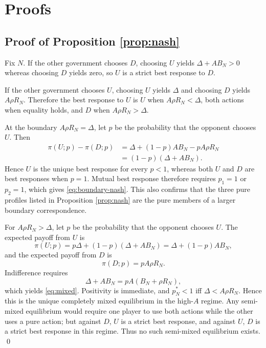 \section{Proofs}
\label{app:proofs}

\subsection{Proof of Proposition \ref{prop:nash}}

Fix $N$. If the other government chooses $D$, choosing $U$ yields $\Delta+A B_N>0$ whereas choosing $D$ yields zero, so $U$ is a strict best response to $D$.

If the other government chooses $U$, choosing $U$ yields $\Delta$ and choosing $D$ yields $A\rho R_N$. Therefore the best response to $U$ is $U$ when $A\rho R_N<\Delta$, both actions when equality holds, and $D$ when $A\rho R_N>\Delta$.

At the boundary $A\rho R_N=\Delta$, let $p$ be the probability that the opponent chooses $U$. Then
\begin{align}
\pi(U;p)-\pi(D;p)
&=\Delta+(1-p)A B_N-pA\rho R_N\\
&=(1-p)(\Delta+A B_N).
\end{align}
Hence $U$ is the unique best response for every $p<1$, whereas both $U$ and $D$ are best responses when $p=1$. Mutual best response therefore requires $p_1=1$ or $p_2=1$, which gives \eqref{eq:boundary-nash}. This also confirms that the three pure profiles listed in Proposition \ref{prop:nash} are the pure members of a larger boundary correspondence.

For $A\rho R_N>\Delta$, let $p$ be the probability that the opponent chooses $U$. The expected payoff from $U$ is
\begin{equation}
\pi(U;p)=p\Delta+(1-p)(\Delta+A B_N)
=\Delta+(1-p)A B_N,
\end{equation}
and the expected payoff from $D$ is
\begin{equation}
\pi(D;p)=pA\rho R_N.
\end{equation}
Indifference requires
\begin{equation}
\Delta+A B_N=pA(B_N+\rho R_N),
\end{equation}
which yields \eqref{eq:mixed}. Positivity is immediate, and $p_N^*<1$ iff $\Delta<A\rho R_N$. Hence this is the unique completely mixed equilibrium in the high-$A$ regime. Any semi-mixed equilibrium would require one player to use both actions while the other uses a pure action; but against $D$, $U$ is a strict best response, and against $U$, $D$ is a strict best response in this regime. Thus no such semi-mixed equilibrium exists. \qed

